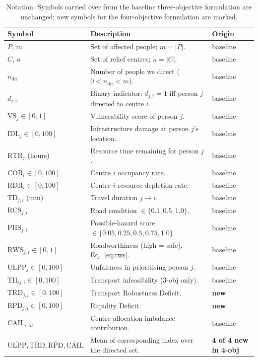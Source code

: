 \documentclass[applsci,article,submit,moreauthors,pdftex]{Definitions/mdpi}
\begin{document}
\begin{table}[!t]
\centering
\caption{Notation. Symbols carried over from the baseline three-objective
formulation are unchanged; new symbols for the four-objective formulation are marked.}
\label{tab:notation}
\small
\begin{tabularx}{\textwidth}{l X l}
\toprule
\textbf{Symbol} & \textbf{Description} & \textbf{Origin} \\
\midrule
$P$, $m$ & Set of affected people; $m = |P|$. & baseline \\
$C$, $n$ & Set of relief centres; $n = |C|$. & baseline \\
$n_{\mathrm{dir}}$ & Number of people we direct ($0 < n_{\mathrm{dir}} < m$). & baseline \\
$d_{j,i}$ & Binary indicator: $d_{j,i} = 1$ iff person $j$ directed to centre $i$. & baseline \\
$\mathrm{VS}_j \in [0,1]$ & Vulnerability score of person $j$. & baseline \\
$\mathrm{IDL}_j \in [0,100]$ & Infrastructure damage at person $j$'s location. & baseline \\
$\mathrm{RTR}_j$ (hours) & Resource time remaining for person $j$. & baseline \\
$\mathrm{COR}_i \in [0,100]$ & Centre $i$ occupancy rate. & baseline \\
$\mathrm{RDR}_i \in [0,100]$ & Centre $i$ resource depletion rate. & baseline \\
$\mathrm{TD}_{j,i}$ (min) & Travel duration $j \to i$. & baseline \\
$\mathrm{RCS}_{j,i}$ & Road condition $\in \{0.1, 0.5, 1.0\}$. & baseline \\
$\mathrm{PHS}_{j,i}$ & Possible-hazard score $\in \{0.05, 0.25, 0.5, 0.75, 1.0\}$. & baseline \\
$\mathrm{RWS}_{j,i} \in [0,1]$ & Roadworthiness (high = safe), Eq.~\eqref{eq:rws}. & baseline \\
$\mathrm{ULPP}_j \in [0,100]$ & Unfairness in prioritising person $j$. & baseline \\
$\mathrm{TIL}_{j,i} \in [0,100]$ & Transport infeasibility (3-obj only). & baseline \\
$\mathrm{TRD}_{j,i} \in [0,100]$ & Transport Robustness Deficit. & \textbf{new} \\
$\mathrm{RPD}_{j,i} \in [0,100]$ & Rapidity Deficit. & \textbf{new} \\
$\mathrm{CAIL}_{i,td}$ & Centre allocation imbalance contribution. & baseline \\
$\overline{\mathrm{ULPP}}, \overline{\mathrm{TRD}}, \overline{\mathrm{RPD}}, \overline{\mathrm{CAIL}}$
& Mean of corresponding index over the directed set. & \textbf{4 of 4 new in 4-obj} \\
\bottomrule
\end{tabularx}
\end{table}
\end{document}
